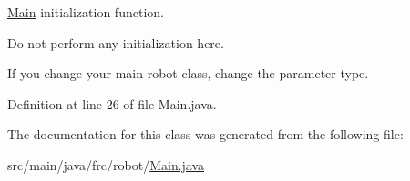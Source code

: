 \hyperlink{classfrc_1_1robot_1_1_main}{Main} initialization function. 

Do not perform any initialization here.

If you change your main robot class, change the parameter type. 

Definition at line 26 of file Main.\+java.



The documentation for this class was generated from the following file\+:\begin{DoxyCompactItemize}
\item 
src/main/java/frc/robot/\hyperlink{_main_8java}{Main.\+java}\end{DoxyCompactItemize}
